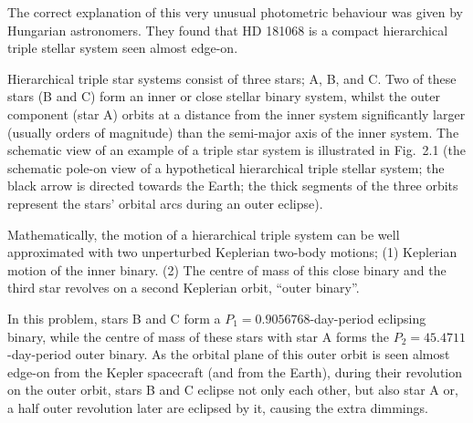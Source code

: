The correct explanation of this very unusual photometric behaviour was given
by Hungarian astronomers. They found that HD 181068 is a compact hierarchical
triple stellar system seen almost edge-on.

Hierarchical triple star systems consist of three stars; A, B, and C. Two of
these stars (B and C) form an inner or close stellar binary system, whilst
the outer component (star A) orbits at a distance from the inner system
significantly larger (usually orders of magnitude) than the semi-major axis
of the inner system. The schematic view of an example of a triple star system
is illustrated in Fig.~2.1 (the schematic pole-on view of a hypothetical
hierarchical triple stellar system; the black arrow is directed towards the
Earth; the thick segments of the three orbits represent the stars' orbital
arcs during an outer eclipse).

Mathematically, the motion of a hierarchical triple system can be well
approximated with two unperturbed Keplerian two-body motions; (1) Keplerian
motion of the inner binary. (2) The centre of mass of this close binary and
the third star revolves on a second Keplerian orbit, ``outer binary''.

In this problem, stars B and C form a $P_1 = 0.9056768$-day-period eclipsing
binary, while the centre of mass of these stars with star A forms the
$P_2 = 45.4711$-day-period outer binary. As the orbital plane of this outer
orbit is seen almost edge-on from the Kepler spacecraft (and from the Earth),
during their revolution on the outer orbit, stars B and C eclipse not only
each other, but also star A or, a half outer revolution later are eclipsed by
it, causing the extra dimmings.

